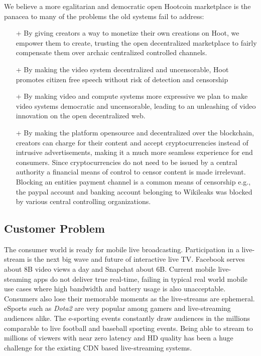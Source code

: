 \documentclass{article}
\begin{document}
We believe a more egalitarian and democratic open Hootcoin marketplace is the
panacea to many of the problems the old systems fail to address:
\begin{itemize}
\item[+]By giving creators a way to monetize their own creations on Hoot, we
empower them to create, trusting the open decentralized marketplace to fairly compensate
them over archaic centralized controlled channels.
\item[+]By making the video system decentralized and uncensorable, Hoot promotes citizen free speech without risk of detection and censorship
\item[+]By making video and compute systems more expressive we plan to make video systems democratic and uncensorable, leading to an unleashing of video innovation on the open decentralized web.
\item[+]By making the platform opensource and decentralized over the
  blockchain, creators can charge for their content and accept cryptocurrencies instead of intrusive advertisements, making it a  much more seamless experience for end consumers. Since  cryptocurrencies do not need to be issued by a central authority  a financial means of control to censor content is made irrelevant. Blocking an entities  payment channel is a common means of censorship e.g., the   paypal account and banking account belonging to  Wikileaks was blocked by various central controlling organizations.
\end{itemize}


\subsection{Customer Problem}
The consumer world is ready for mobile live broadcasting. Participation in a live-stream is the next big wave and future of interactive live TV. Facebook serves about 8B video views a day and Snapchat about 6B. Current mobile live-steaming apps do not deliver true real-time, failing in typical real world mobile use cases where high bandwidth and battery usage is also unacceptable. Consumers also lose their memorable moments as the live-streams are ephemeral. eSports such as \emph{Dota2} are very popular among gamers and live-streaming audiences alike. The e-sporting events constantly draw audiences in the millions comparable to live football and baseball sporting events. Being able to stream to millions of viewers with near zero latency and HD quality has been a huge challenge for the existing CDN based live-streaming systems.
\end{document}
